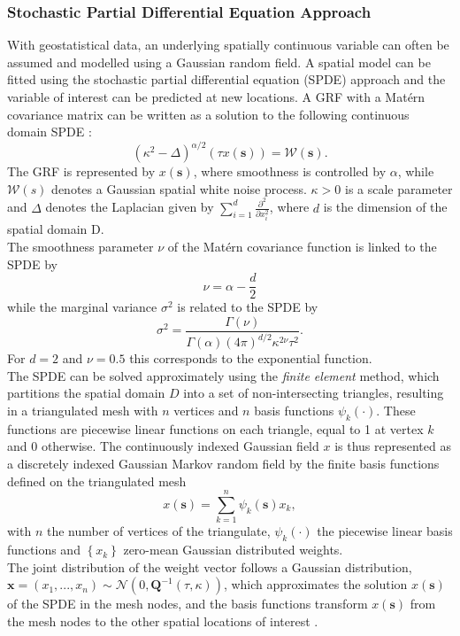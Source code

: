 \subsubsection{Stochastic Partial Differential Equation Approach}
With geostatistical data, an underlying spatially continuous variable can often be assumed and modelled using a Gaussian random field. A spatial model can be fitted using the stochastic partial differential equation (SPDE) approach and the variable of interest can be predicted at new locations. A GRF with a Matérn covariance matrix can be written as a solution to the following continuous domain SPDE \autocite[][]{whittle1963stochastic}:
\begin{equation}
    \left(\kappa^2-\Delta\right)^{\alpha/2}\left(\tau x\left(\pmb{s}\right)\right) = \mathcal{W}\left(\pmb{s}\right).
\end{equation}
The GRF is represented by $x\left(\pmb{s}\right)$, where smoothness is controlled by $\alpha$, while $\mathcal{W}\left(s\right)$ denotes a Gaussian spatial white noise process. $\kappa>0$ is a scale parameter and $\Delta$ denotes the Laplacian given by $\sum_{i=1}^d\frac{\partial^2}{\partial x_i^2}$, where $d$ is the dimension of the spatial domain D. \\
The smoothness parameter $\nu$ of the Matérn covariance function is linked to the SPDE by
\begin{equation*}
    \nu=\alpha-\frac{d}{2}
\end{equation*}
while the marginal variance $\sigma^2$ is related to the SPDE by
\begin{equation*}
    \sigma^2=\frac{\Gamma\left(\nu\right)}{\Gamma\left(\alpha\right)\left(4\pi\right)^{d/2}\kappa^{2\nu}\tau^2}.
\end{equation*}
For $d=2$ and $\nu=0.5$ this corresponds to the exponential function. \\
The SPDE can be solved approximately using the \textit{finite element} method, which partitions the spatial domain $D$ into a set of non-intersecting triangles, resulting in a triangulated mesh with $n$ vertices and $n$ basis functions $\psi_k\left(\cdot\right)$. These functions are piecewise linear functions on each triangle, equal to 1 at vertex $k$ and 0 otherwise. The continuously indexed Gaussian field $x$ is thus represented as a discretely indexed Gaussian Markov random field by the finite basis functions defined on the triangulated mesh
\begin{equation}
    x\left(\pmb{s}\right)=\sum_{k=1}^n\psi_k\left(\pmb{s}\right)x_k,
\end{equation}
with $n$ the number of vertices of the triangulate, $\psi_k\left(\cdot\right)$ the piecewise linear basis functions and $\left\lbrace x_k\right\rbrace$ zero-mean Gaussian distributed weights. \\
The joint distribution of the weight vector follows a Gaussian distribution, $\pmb{x}=\left(x_1,... ,x_n\right)\sim\mathcal{N}\left(0, \pmb{Q}^{-1}\left(\tau, \kappa\right)\right)$, which approximates the solution $x\left(\pmb{s}\right)$ of the SPDE in the mesh nodes, and the basis functions transform $x\left(\pmb{s}\right)$ from the mesh nodes to the other spatial locations of interest \autocite[][]{moraga2019geospatial}.